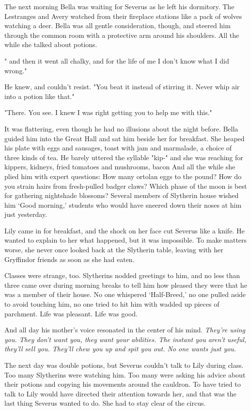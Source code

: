 The next morning Bella was waiting for Severus as he left his dormitory. The Lestranges and Avery watched from their fireplace stations like a pack of wolves watching a deer. Bella was all gentle consideration, though, and steered him through the common room with a protective arm around his shoulders. All the while she talked about potions.

"{\el} and then it went all chalky, and for the life of me I don't know what I did wrong."

He knew, and couldn't resist. "You{\el} beat it instead of{\el} stirring it. Never whip{\el} air into a potion like{\el} that."

"There. You see. I knew I was right getting you to help me with this."

It was flattering, even though he had no illusions about the night before. Bella guided him into the Great Hall and sat him beside her for breakfast. She heaped his plate with eggs and sausages, toast with jam and marmalade, a choice of three kinds of tea. He barely uttered the syllable "kip-" and she was reaching for kippers, kidneys, fried tomatoes and mushrooms, bacon{\el} And all the while she plied him with expert questions: How many ortolan eggs to the pound? How do you strain hairs from fresh-pulled badger claws? Which phase of the moon is best for gathering nightshade blossoms? Several members of Slytherin house wished him `Good morning,' students who would have sneered down their noses at him just yesterday.

Lily came in for breakfast, and the shock on her face cut Severus like a knife. He wanted to explain to her what happened, but it was impossible. To make matters worse, she never once looked back at the Slytherin table, leaving with her Gryffindor friends as soon as she had eaten.

Classes were strange, too. Slytherins nodded greetings to him, and no less than three came over during morning breaks to tell him how pleased they were that he was a member of their house. No one whispered `Half-Breed,' no one pulled aside to avoid touching him, no one tried to hit him with wadded up pieces of parchment. Life was pleasant. Life was good.

And all day his mother's voice resonated in the center of his mind. \emph{They're using you. They don't want you, they want your abilities. The instant you aren't useful, they'll sell you. They'll chew you up and spit you out. No one wants just you.}

The next day was double potions, but Severus couldn't talk to Lily during class. Too many Slytherins were watching him. Too many were asking his advice about their potions and copying his movements around the cauldron. To have tried to talk to Lily would have directed their attention towards her, and that was the last thing Severus wanted to do. She had to stay clear of the circus.

